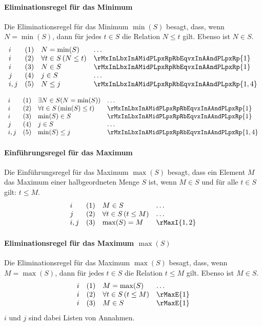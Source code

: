 \documentclass[main.tex]{subfiles}
\begin{document}
\paragraph{Eliminationsregel für das Minimum}
Die Eliminationsregel für das Minimum \(\min(S)\) besagt, dass, wenn \(N = \min(S)\), dann für jedes \(t \in S\) die Relation \(N \leq t\) gilt. Ebenso ist \(N \in S\).
\[
\begin{array}{llll}
    i & (1) & N = \min(S) & \dots \\
    i & (2) & \forall t \in S \, (N \leq t) & \rMxInLbxInAMidPLpxRpRbEqvxInAAndPLpxRp{1} \\
    i & (3) & N \in S & \rMxInLbxInAMidPLpxRpRbEqvxInAAndPLpxRp{1}\\
    j & (4) & j \in S & \hdots\\
    i,j & (5) & N\leq j & \rMxInLbxInAMidPLpxRpRbEqvxInAAndPLpxRp{1,4}\\
\end{array}
\]

\[
\begin{array}{llll}
    i & (1) & \exists N\in S(N = \min(S)) & \dots \\
    i & (2) & \forall t \in S \, (\min(S) \leq t) & \rMxInLbxInAMidPLpxRpRbEqvxInAAndPLpxRp{1} \\
    i & (3) & \min(S) \in S & \rMxInLbxInAMidPLpxRpRbEqvxInAAndPLpxRp{1}\\
    j & (4) & j \in S & \hdots\\
    i,j & (5) & \min(S)\leq j & \rMxInLbxInAMidPLpxRpRbEqvxInAAndPLpxRp{1,4}\\
\end{array}
\]

\paragraph{Einführungsregel für das Maximum}
Die Einführungsregel für das Maximum \(\max(S)\) besagt, dass ein Element \(M\) das Maximum einer halbgeordneten Menge \(S\) ist, wenn \(M \in S\) und für alle \(t \in S\) gilt: \(t \leq M\).
\[
\begin{array}{llll}
    i   & (1) & M \in S & \dots \\
    j   & (2) & \forall t \in S \, (t \leq M) & \dots \\
    i,j & (3) & \max(S) = M & \rMaxI{1,2}
\end{array}
\]

\paragraph{Eliminationsregel für das Maximum \(\max(S)\)}
Die Eliminationsregel für das Maximum \(\max(S)\) besagt, dass, wenn \(M = \max(S)\), dann für jedes \(t \in S\) die Relation \(t \leq M\) gilt. Ebenso ist \(M \in S\).
\[
\begin{array}{llll}
    i & (1) & M = \max(S) & \dots \\
    i & (2) & \forall t \in S \, (t \leq M) & \rMaxE{1} \\
    i & (3) & M \in S & \rMaxE{1}
\end{array}
\]
\(i\) und \(j\) sind dabei Listen von Annahmen.
\end{document}
